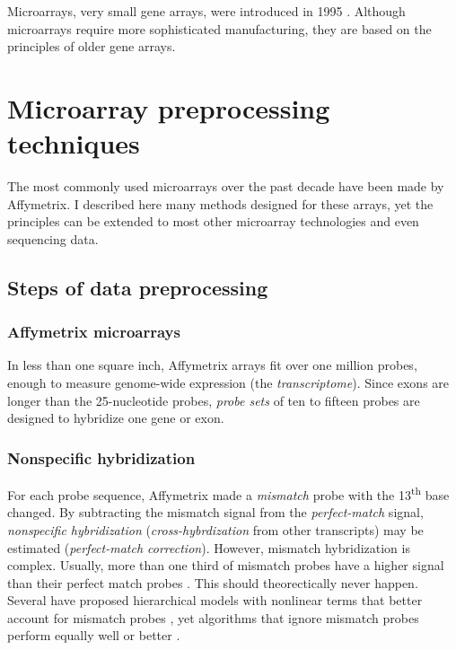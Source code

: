 Microarrays, very small gene arrays, were introduced in 1995 \cite{Schena:1995fy}. 
Although microarrays require more sophisticated
manufacturing, they are based on the principles of older gene arrays.


\section[Microarray preprocessing]{Microarray preprocessing techniques}

The most commonly used microarrays over the past decade
have been made by Affymetrix. I described here many methods
designed for these arrays, yet the principles can be extended to
most other microarray technologies and even sequencing data.

\subsection{Steps of data preprocessing}\label{introjtm:steps}

\subsubsection{Affymetrix microarrays}

In less than one square inch, Affymetrix arrays fit over one million probes, enough
to measure genome-wide expression (the \textit{transcriptome}).
Since exons are longer than the 25-nucleotide probes,
\textit{probe sets} of ten to fifteen probes are designed to hybridize
one gene or exon.

\subsubsection{Nonspecific hybridization}

For each probe sequence, Affymetrix made a
\textit{mismatch} probe with the 13\textsuperscript{th} 
base changed. 
By subtracting the mismatch signal from the \textit{perfect-match} signal,
\textit{nonspecific hybridization} (\textit{cross-hybrdization} 
from other transcripts) may be 
estimated (\textit{perfect-match correction}).
However, mismatch hybridization is complex.
Usually, more than one third of mismatch probes have a higher
signal than their perfect match probes \cite{Irizarry:2003ge}. 
This should theorectically never happen. Several have proposed
hierarchical models with nonlinear terms that
better account for mismatch probes 
\cite{Li:2001jv,Milo:2003tt,Liu:2005ey,Hein:2005ip}, yet algorithms
that ignore mismatch probes perform equally
well or better \cite{Chen:2007cr,Irizarry:2003ge,Hochreiter:2006ja}.

